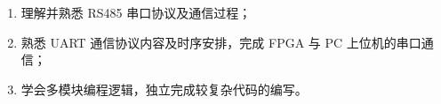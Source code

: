 \begin{enumerate}
    \item 理解并熟悉 RS485 串口协议及通信过程；
    \item 熟悉 UART 通信协议内容及时序安排，完成 FPGA 与 PC 上位机的串口通信；
    \item 学会多模块编程逻辑，独立完成较复杂代码的编写。
\end{enumerate}

